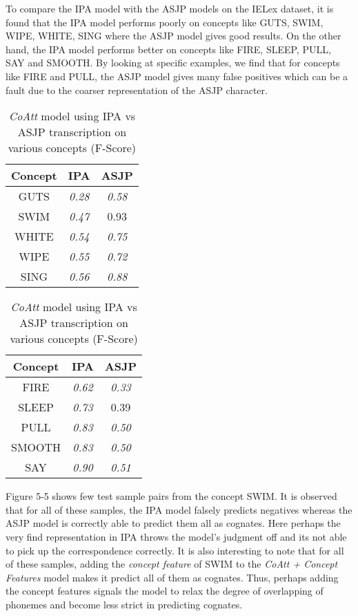 To compare the IPA model with the ASJP models on the IELex dataset, it is found that the IPA model performs poorly on concepts like GUTS, SWIM, WIPE, WHITE, SING where the ASJP model gives good results. On the other hand, the IPA model performs better on concepts like FIRE, SLEEP, PULL, SAY and SMOOTH. By looking at specific examples, we find that for concepts like FIRE and PULL, the ASJP model gives many false positives which can be a fault due to the coarser representation of the ASJP character.

\begin{table}[h]
\centering
	\begin{minipage}{.5\linewidth}
      \centering

\begin{tabular}{ccc}
\textbf{Concept} & \textbf{IPA}  & \textbf{ASJP} \\ \hline
GUTS             & \textit{0.28} & \textit{0.58} \\
SWIM             & \textit{0.47} & 0.93          \\
WHITE            & \textit{0.54} & \textit{0.75} \\
WIPE             & \textit{0.55} & \textit{0.72} \\
SING             & \textit{0.56} & \textit{0.88}
\end{tabular}

	\end{minipage}%
    \begin{minipage}{.5\linewidth}
    \centering

\begin{tabular}{ccc}
\textbf{Concept} & \textbf{IPA}  & \textbf{ASJP} \\ \hline
FIRE             & \textit{0.62} & \textit{0.33} \\
SLEEP            & \textit{0.73} & 0.39          \\
PULL             & \textit{0.83} & \textit{0.50} \\
SMOOTH           & \textit{0.83} & \textit{0.50} \\
SAY              & \textit{0.90} & \textit{0.51}
\end{tabular}

	\end{minipage} 
\caption{\textit{CoAtt} model using IPA vs ASJP transcription on various concepts (F-Score)}
\end{table}

\clearpage
Figure 5-5 shows few test sample pairs from the concept SWIM. It is observed that for all of these samples, the IPA model falsely predicts negatives whereas the ASJP model is correctly able to predict them all as cognates. Here perhaps the very find representation in IPA throws the model's judgment off and its not able to pick up the correspondence correctly. It is also interesting to note that for all of these samples, adding the \textit{concept feature} of SWIM to the \textit{CoAtt + Concept Features} model makes it predict all of them as cognates. Thus, perhaps adding the concept features signals the model to relax the degree of overlapping of phonemes and become less strict in predicting cognates.

